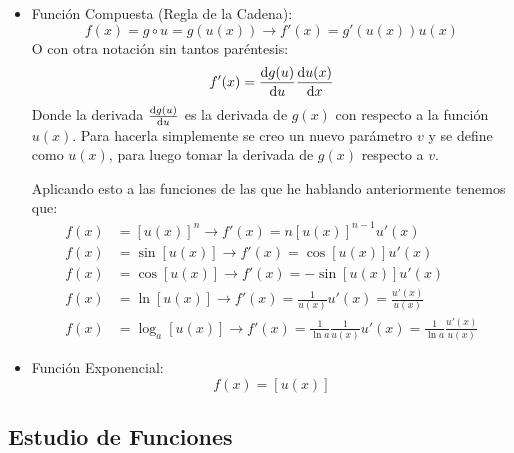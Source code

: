 \documentclass[arial,a4paper,print]{article}
\begin{document}
\begin{itemize}
\item Función Compuesta (Regla de la Cadena):\\
\begin{equation*}
	f(x) = g\circ u = g(u(x)) \rightarrow f'(x) = g'(u(x))u(x)
\end{equation*}
O con otra notación sin tantos paréntesis:
\begin{equation*}
	f'(x) = \dv{g(u)}{u}\dv{u(x)}{x}
\end{equation*}
Donde la derivada $\dv{g(u)}{u}$ es la derivada de $g(x)$ con respecto a la función $u(x)$. Para hacerla simplemente se creo un nuevo parámetro $v$ y se define como $u(x)$, para luego tomar la derivada de $g(x)$ respecto a $v$. 

Aplicando esto a las funciones de las que he hablando anteriormente tenemos que:
\begin{align*}
	f(x) &= [u(x)]^{n} \rightarrow f'(x) = n[u(x)]^{n-1}u'(x) \\
	f(x) &= \sin[u(x)] \rightarrow f'(x) = \cos[u(x)]u'(x) \\
	f(x) &= \cos[u(x)] \rightarrow f'(x) = -\sin[u(x)]u'(x) \\
	f(x) &= \ln[u(x)] \rightarrow f'(x) = \frac{1}{u(x)} u'(x) = \frac{u'(x)}{u(x)} \\
	f(x) &= \log_a [u(x)] \rightarrow f'(x) = \frac{1}{\ln a} \frac{1}{u(x)} u'(x) = \frac{1}{\ln a}\frac{u'(x)}{u(x)} 
\end{align*}

\item Función Exponencial:\\
\begin{equation*}
	f(x) = [u(x)]
\end{equation*}

\end{itemize}


\subsection{Estudio de Funciones}
\end{document}
